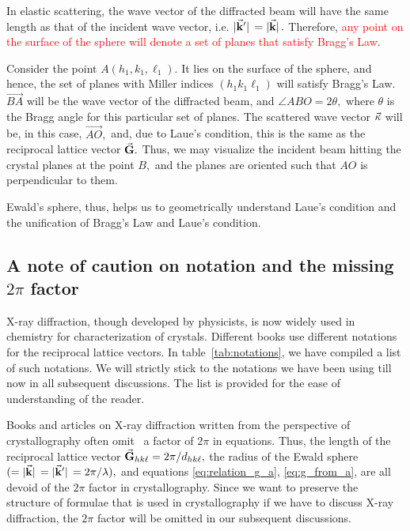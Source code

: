 	In elastic scattering, the wave vector of the diffracted beam will have the same length as that of the incident wave vector, i.e. $\abs*{\va{k}'} = \abs*{\va{k}}.$  Therefore, \textcolor{red}{any point on the surface of the sphere will denote a set of planes that satisfy Bragg's Law}.
	
	Consider the point $A(h_1, k_1, \ell_1).$ It lies on the surface of the sphere, and hence, the set of planes with Miller indices $(h_1 k_1 \ell_1)$ will satisfy Bragg's Law. $\overrightarrow{BA}$ will be the wave vector of the diffracted beam, and $\angle ABO = 2\theta,$ where $\theta$ is the Bragg angle for this particular set of planes. The scattered wave vector $\va{\kappa}$ will be, in this case, $\overrightarrow{AO},$ and, due to Laue's condition, this is the same as the reciprocal lattice vector $\va{G}.$ Thus, we may visualize the incident beam hitting the crystal planes at the point $B,$ and the planes are oriented such that $AO$ is perpendicular to them.
	
	Ewald's sphere, thus, helps us to geometrically understand Laue's condition and the unification of Bragg's Law and Laue's condition.
	

\subsection*{A note of caution on notation and the missing $2\pi$ factor}

X-ray diffraction, though developed by physicists, is now widely used in chemistry for characterization of crystals. Different books use different notations for the reciprocal lattice vectors. In table~\ref{tab:notations}, we have compiled a list of such notations. We will strictly stick to the notations we have been using till now in all subsequent discussions. The list is provided for the ease of understanding of the reader.

Books and articles on X-ray diffraction written from the perspective of crystallography often omit~\cite[chapter~5]{Waseda2011} a factor of $2\pi$ in equations. Thus, the length of the reciprocal lattice vector $\va{G}_{hk\ell} = 2\pi / d_{hk\ell},$ the radius of the Ewald sphere $(=\abs*{\va{k}} = \abs*{\va{k}'} = 2\pi / \lambda),$ and equations \eqref{eq:relation_g_a}, \eqref{eq:g_from_a}, are all devoid of the $2\pi$ factor in crystallography. Since we want to preserve the structure of formulae that is used in crystallography if we have to discuss X-ray diffraction, the $2\pi$ factor will be omitted in our subsequent discussions.

